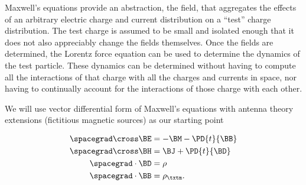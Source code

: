 %
%
Maxwell's equations provide an abstraction, the field, that aggregates the effects of an arbitrary electric charge and current
distribution on a ``test'' charge distribution.
The test charge is assumed to be small and isolated enough that it does not also appreciably change the fields themselves.
Once the fields are determined, the Lorentz force equation can be used to determine the dynamics of the
test particle.
These dynamics can be determined without having to
compute all the interactions of that charge with all the charges and currents in space, nor having to continually account for
the interactions of those charge with each other.

We will use vector differential form of Maxwell's equations with antenna theory extensions (fictitious magnetic sources) as our starting point


\index{\(\BE\)}
\index{\(\BH\)}
\index{\(\BB\)}
\index{\(\BD\)}
\index{\(\BM\)}
\index{\(\BJ\)}
\index{\(\rho\)}
\index{\(\rho_\txtm\)}

\begin{equation}\label{eqn:freespace:3399}
\begin{aligned}
\spacegrad \cross \BE &= - \BM - \PD{t}{\BB} \\
\spacegrad \cross \BH &= \BJ + \PD{t}{\BD} \\
\spacegrad \cdot \BD &= \rho \\
\spacegrad \cdot \BB &= \rho_\txtm.
\end{aligned}
\end{equation}

